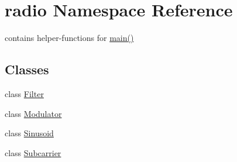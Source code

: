 \hypertarget{namespaceradio}{\section{radio Namespace Reference}
\label{namespaceradio}
}


contains helper-\/functions for \hyperlink{alsa__test_8cpp_ae66f6b31b5ad750f1fe042a706a4e3d4}{main()}  


\subsection*{Classes}
\begin{DoxyCompactItemize}
\item 
class \hyperlink{classradio_1_1Filter}{Filter}
\item 
class \hyperlink{classradio_1_1Modulator}{Modulator}
\item 
class \hyperlink{classradio_1_1Sinusoid}{Sinusoid}
\item 
class \hyperlink{classradio_1_1Subcarrier}{Subcarrier}
\end{DoxyCompactItemize}
